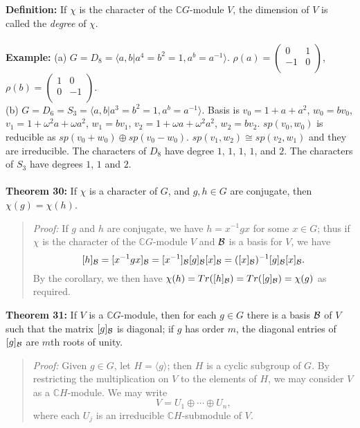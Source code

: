 {{\bf Definition:} If $\chi$ is the character of the ${\mathbb C}G$-module $V$,
the dimension of $V$ is called the \emph{degree} of $\chi$.
\\
\\
{\bf Example:} (a) $G = D_8 = \langle a, b| a^4=b^2=1, a^b = a^{-1}\rangle$.
$\rho(a) =
\left(
\begin{array}{cc}
0&1\\
-1&0\\
\end{array}
\right)$,
$\rho(b) =
\left(
\begin{array}{cc}
1&0\\
0&-1\\
\end{array}
\right)$.\\
(b) $G = D_6 = S_3 = \langle a, b| a^3=b^2=1, a^b = a^{-1}\rangle$.  Basis is
$v_0 = 1 + a + a^2$, $w_0= b v_0$,
$v_1 = 1 + \omega^2a + \omega a^2$, $w_1= b v_1$,
$v_2 = 1 + \omega a + \omega^2 a^2$, $w_2= b v_2$.
$sp(v_0, w_0)$ is reducible as $sp(v_0 + w_0) \oplus sp(v_0 - w_0)$.
$sp(v_1, w_2) \cong sp(v_2, w_1)$ and they are irreducible.
The characters of $D_8$ have degree $1$, $1$, $1$, $1$, and $2$.
The characters of $S_3$
have degrees $1$, $1$ and $2$.
\\
\\
{\bf Theorem 30:} If $\chi$ is a character of $G$, and
$g,h\in G$ are conjugate, then $\chi(g)=\chi(h)$.
\begin{quote}
\emph{Proof:}
If $g$ and $h$ are conjugate, we have $h=x^{-1}gx$ for some $x\in G$;
thus if $\chi$ is the character of
the ${\mathbb C}G$-module $V$ and ${\cal B}$ is a basis for $V$, we have
$$[h]_{\cal B}=[x^{-1}gx]_{\cal B}=[x^{-1}]_{\cal B}[g]_{\cal B}[x]_{\cal B}=([x]_{\cal B})^{-1}[g]_{\cal B}[x]_{\cal B}.$$
By the corollary,
we then have $\chi(h)=Tr([h]_{\cal B})=Tr([g]_{\cal B})=\chi(g)$ as
required.
\end{quote}
{\bf Theorem 31:} If $V$ is a ${\mathbb C}G$-module, then for each
$g\in G$ there is a basis ${\cal B}$ of $V$ such that the matrix $[g]_{\cal B}$ is
diagonal; if $g$ has order $m$, the diagonal entries of $[g]_{\cal B}$ are $m$th
roots of unity.
\begin{quote}
\emph{Proof:}
Given $g\in G$, let $H=\langle g\rangle$; then $H$ is a cyclic subgroup of
$G$. By restricting the multiplication on $V$ to the elements of $H$, we may
consider $V$ as a ${\mathbb C} H$-module. We may write
$$V=U_1\oplus\cdots\oplus U_n,$$
where each $U_j$ is an irreducible ${\mathbb C} H$-submodule of $V$.

\end{quote}}
